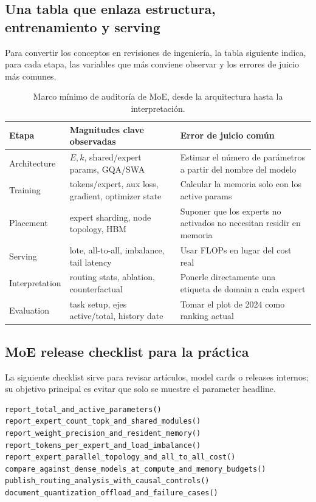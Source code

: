 \documentclass[a4paper]{article}
\begin{document}
\subsection{Una tabla que enlaza estructura, entrenamiento y serving}

Para convertir los conceptos en revisiones de ingeniería, la tabla siguiente indica, para cada etapa, las variables que más conviene observar y los errores de juicio más comunes.

\begin{table}[H]
\centering
\small
\begin{tabularx}{\textwidth}{L{0.16\textwidth} L{0.27\textwidth} X}
\toprule
Etapa & Magnitudes clave observadas & Error de juicio común \\
\midrule
Architecture & $E,k$, shared/expert params, GQA/SWA & Estimar el número de parámetros a partir del nombre del modelo \\
Training & tokens/expert, aux loss, gradient, optimizer state & Calcular la memoria solo con los active params \\
Placement & expert sharding, node topology, HBM & Suponer que los experts no activados no necesitan residir en memoria \\
Serving & lote, all-to-all, imbalance, tail latency & Usar FLOPs en lugar del cost real \\
Interpretation & routing stats, ablation, counterfactual & Ponerle directamente una etiqueta de domain a cada expert \\
Evaluation & task setup, ejes active/total, history date & Tomar el plot de 2024 como ranking actual \\
\bottomrule
\end{tabularx}
\caption{Marco mínimo de auditoría de MoE, desde la arquitectura hasta la interpretación.}
\end{table}

\subsection{MoE release checklist para la práctica}

La siguiente checklist sirve para revisar artículos, model cards o releases internos; su objetivo principal es evitar que solo se muestre el parameter headline.

\begin{lstlisting}[caption={Sparse MoE release checklist}]
report_total_and_active_parameters()
report_expert_count_topk_and_shared_modules()
report_weight_precision_and_resident_memory()
report_tokens_per_expert_and_load_imbalance()
report_expert_parallel_topology_and_all_to_all_cost()
compare_against_dense_models_at_compute_and_memory_budgets()
publish_routing_analysis_with_causal_controls()
document_quantization_offload_and_failure_cases()
\end{lstlisting}
\end{document}
